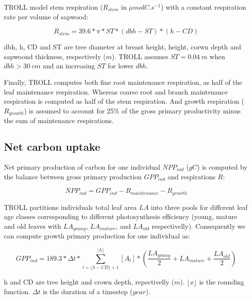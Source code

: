 \documentclass[12pt,]{article}
\theoremstyle{definition}
\theoremstyle{definition}
\theoremstyle{remark}
\begin{document}
TROLL model stem respiration (\(R_{stem}\) in \(\mu molC.s^{-1}\)) with
a constant respiration rate per volume of sapwood:

\begin{equation}
  R_{stem} = 39.6*\pi*ST*(dbh-ST)*(h-CD)
  \label{eq:Rs}
\end{equation}

dbh, h, CD and ST are tree diameter at breast height, height, corwn
depth and sapwoond thickness, respectively (\(m\)). TROLL assumes
\(ST=0.04~m\) when \(dbh>30~cm\) and an increasing \(ST\) for lower
\(dbh\).

Finally, TROLL computes both fine root maintenance respiration, as half
of the leaf maintenance respiration. Whereas coarse root and branch
maintenance respiration is computed as half of the stem respiration. And
growth respiration (\(R_{growth}\)) is assumed to account for 25\% of
the gross primary productivity minus the sum of maintenance
respirations.

\subsection{Net carbon uptake}\label{net-carbon-uptake}

Net primary production of carbon for one individual \(NPP_{ind}\)
(\(gC\)) is computed by the balance between gross primary production
\(GPP_{ind}\) and respirations \(R\):

\begin{equation}
  NPP_{ind} = GPP_{ind} - R_{maintenance} - R_{growth}
  \label{eq:NPP}
\end{equation}

TROLL partitions individuals total leaf area \(LA\) into three pools for
different leaf age classes corresponding to different photosynthesis
efficiency (young, mature and old leaves with \(LA_{young}\),
\(LA_{mature}\), and \(LA_{old}\) respectivelly). Consequently we can
compute growth primary production for one individual as:

\begin{equation}
  GPP_{ind} = 189.3 * \Delta t * \sum _{l= \lfloor h-CD \rfloor +1} ^{\lfloor h \rfloor} [A_l] * (\frac{LA_{young}}{2} + LA_{mature} + \frac{LA_{old}}{2})
  \label{eq:GPP}
\end{equation}

h and CD are tree height and crown depth, repectivelly (\(m\)).
\(\lfloor x \rfloor\) is the rounding function. \(\Delta t\) is the
duration of a timestep (\(year\)).
\end{document}
